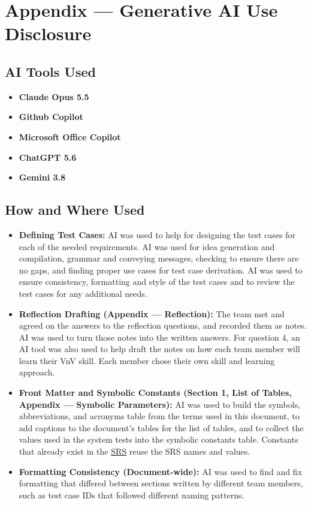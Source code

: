 \documentclass[12pt, titlepage]{article}
\begin{document}
\newpage{}

\section{Appendix --- Generative AI Use Disclosure}

\subsection{AI Tools Used}

\begin{itemize}
    \item \textbf{Claude Opus 5.5}
    \item \textbf{Github Copilot}
    \item \textbf{Microsoft Office Copilot}
    \item \textbf{ChatGPT 5.6}
    \item \textbf{Gemini 3.8}
\end{itemize}

\subsection{How and Where Used}

\begin{itemize}
    \item \textbf{Defining Test Cases:} AI was used to help 
    for designing the test cases for each of the needed requirements. AI was used for 
    idea generation and compilation, grammar and conveying messages, checking to ensure there are no gaps,
    and finding proper use cases for test case derivation. AI was used to ensure consistency, formatting and 
    style of the test cases and to review the test cases for any additional needs.
    \item \textbf{Reflection Drafting (Appendix --- Reflection):} The team met
    and agreed on the answers to the reflection questions, and recorded them as
    notes. AI was used to turn those notes into the written answers. For
    question 4, an AI tool was also used to help draft the notes on how each
    team member will learn their VnV skill. Each member chose their own skill
    and learning approach.
    \item \textbf{Front Matter and Symbolic Constants (Section 1, List of
    Tables, Appendix --- Symbolic Parameters):} AI was used to build the
    symbols, abbreviations, and acronyms table from the terms used in this
    document, to add captions to the document's tables for the list of tables,
    and to collect the values used in the system tests into the symbolic
    constants table. Constants that already exist in the \href{https://github.com/arjunkarthik123/fitness-finance-application/blob/main/pdfs/SRS-Volere/SRS.pdf}{SRS} reuse
    the SRS names and values.
    \item \textbf{Formatting Consistency (Document-wide):} AI was used to
    find and fix formatting that differed between sections written by
    different team members, such as test case IDs that followed different
    naming patterns.
\end{itemize}
\end{document}
